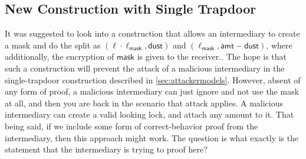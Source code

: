 \subsection{New Construction with Single Trapdoor}

It was suggested to look into a construction that allows an intermediary to create a mask and 
do the split as $(\ell \cdot \ell_\mathsf{mask}, \mathsf{dust})$ and $(\ell_\mathsf{mask}, 
\mathsf{amt}-\mathsf{dust})$, where additionally, the encryption of $\mathsf{mask}$ is given to 
the receiver.. The hope is that such a construction will prevent the attack of a malicious 
intermediary in the single-trapdoor construction described in \cref{sec:attackermodels}. 
However, absent of any form of proof, a malicious intermediary can just ignore and not use the 
mask at all, and then you are back in the scenario that attack applies. A malicious intermediary 
can create a valid looking lock, and attach any amount to it. That being said, if we include some 
form of correct-behavior proof from the intermediary, then this approach might work. The 
question is what exactly is the statement that the intermediary is trying to proof here?

\clearpage